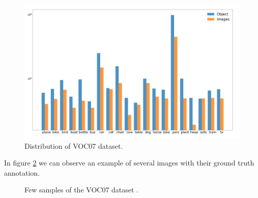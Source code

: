 \begin{figure}[hptb]
\centering         
\includegraphics[width=15cm]{datasets/logFinal.png}
\caption{Distribution of VOC07 dataset.} \label{data07}
\end{figure}


In figure \ref{voc07data} we can observe an example of several images with their ground truth annotation.

\begin{figure}[H]
		
\centering
{}
\caption{Few samples of the VOC07 dataset .} \label{voc07data}

\end{figure}


